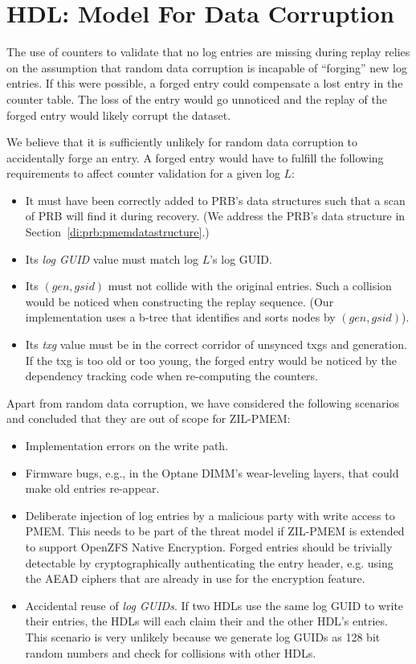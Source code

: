 \documentclass[12pt,a4paper,twoside]{book}
\begin{document}
\section{HDL: Model For Data Corruption}\label{di:prb:modeldatacorruption}
The use of counters to validate that no log entries are missing during replay relies on the assumption that random data corruption is incapable of ``forging'' new log entries.
If this were possible, a forged entry could compensate a lost entry in the counter table.
The loss of the entry would go unnoticed and the replay of the forged entry would likely corrupt the dataset.

We believe that it is sufficiently unlikely for random data corruption to accidentally forge an entry.
A forged entry would have to fulfill the following requirements to affect counter validation for a given log $L$:
\begin{itemize}[noitemsep]
    \item It must have been correctly added to PRB's data structures such that a scan of PRB will find it during recovery.
        (We address the PRB's data structure in Section~\ref{di:prb:pmemdatastructure}.)
    \item Its \textit{log GUID} value must match log $L$'s log GUID.
    \item Its $(gen, gsid)$ must not collide with the original entries.
        Such a collision would be noticed when constructing the replay sequence.
        (Our implementation uses a b-tree that identifies and sorts nodes by $(gen, gsid)$).
    \item Its \textit{txg} value must be in the correct corridor of unsynced txgs and generation.
        If the txg is too old or too young, the forged entry would be noticed by the dependency tracking code when re-computing the counters.
\end{itemize}

Apart from random data corruption, we have considered the following scenarios and concluded that they are out of scope for ZIL-PMEM:
\begin{itemize}[noitemsep]
\item Implementation errors on the write path.
\item Firmware bugs, e.g., in the Optane DIMM's wear-leveling layers, that could make old entries re-appear.
\item Deliberate injection of log entries by a malicious party with write access to PMEM.
    This needs to be part of the threat model if ZIL-PMEM is extended to support OpenZFS Native Encryption.
    Forged entries should be trivially detectable by cryptographically authenticating the entry header, e.g. using the AEAD ciphers that are already in use for the encryption feature.
\item Accidental reuse of \textit{log GUIDs}.
    If two HDLs use the same log GUID to write their entries, the HDLs will each claim their and the other HDL's entries.
    This scenario is very unlikely because we generate log GUIDs as 128 bit random numbers and check for collisions with other HDLs.
\end{itemize}
\end{document}

